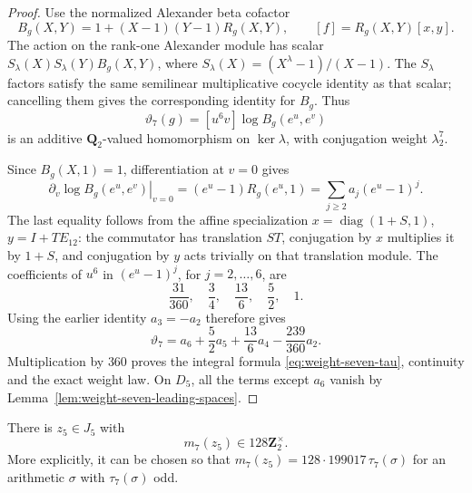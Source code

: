 \begin{proof}
Use the normalized Alexander beta cofactor
\[
 B_g(X,Y)=1+(X-1)(Y-1)R_g(X,Y),\qquad [f]=R_g(X,Y)[x,y].
\]
The action on the rank-one Alexander module has scalar
$S_\lambda(X)S_\lambda(Y)B_g(X,Y)$, where
$S_\lambda(X)=(X^\lambda-1)/(X-1)$. The $S_\lambda$ factors satisfy
the same semilinear multiplicative cocycle identity as that scalar;
cancelling them gives the corresponding identity for $B_g$.
Thus
\[
 \vartheta_7(g)=[u^6v]\log B_g(e^u,e^v)
\]
is an additive $\mathbf Q_2$-valued homomorphism on $\ker\lambda$,
with conjugation weight $\lambda_2^7$.

Since $B_g(X,1)=1$, differentiation at $v=0$ gives
\[
 \left.\partial_v\log B_g(e^u,e^v)\right|_{v=0}
   =(e^u-1)R_g(e^u,1)
   =\sum_{j\ge2}a_j(e^u-1)^j.
\]
The last equality follows from the affine specialization
$x=\operatorname{diag}(1+S,1)$, $y=I+TE_{12}$: the commutator has
translation $ST$, conjugation by $x$ multiplies it by $1+S$, and
conjugation by $y$ acts trivially on that translation module.
The coefficients of $u^6$ in $(e^u-1)^j$, for $j=2,\ldots,6$, are
\[
 \frac{31}{360},\quad\frac34,\quad\frac{13}{6},\quad\frac52,
 \quad1.
\]
Using the earlier identity $a_3=-a_2$ therefore gives
\[
 \vartheta_7=a_6+\frac52a_5+\frac{13}{6}a_4
                         -\frac{239}{360}a_2.
\]
Multiplication by $360$ proves the integral formula
\eqref{eq:weight-seven-tau}, continuity and the exact weight law.
On $D_5$, all the terms except $a_6$ vanish by
Lemma~\ref{lem:weight-seven-leading-spaces}.
\end{proof}

\begin{proposition}\label{prop:weight-seven-arithmetic-value}
There is $z_5\in J_5$ with
\[
 m_7(z_5)\in128\mathbf Z_2^\times.
\]
More explicitly, it can be chosen so that
$m_7(z_5)=128\cdot199017\,\tau_7(\sigma)$ for an arithmetic
$\sigma$ with $\tau_7(\sigma)$ odd.
\end{proposition}

